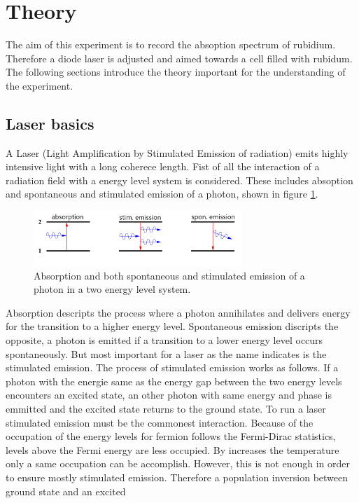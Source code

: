 \section{Theory}
\label{sec:theory}
The aim of this experiment is to record the absoption spectrum
of rubidium. Therefore a diode laser is adjusted and aimed towards a cell
filled with rubidum.
The following sections introduce the theory
important for the understanding of the experiment.

\subsection{Laser basics}
\label{subsec:Laser}
A Laser (Light Amplification by Stimulated Emission of radiation)
emits highly intensive light with a long coherece length.
Fist of all the interaction of a radiation field with
a energy level system is considered. These includes
absoption and spontaneous and stimulated emission
of a photon, shown in figure \ref{fig:ab_em}.
\begin{figure}
\centering
\includegraphics[width=0.7\textwidth]{ab_und_emiss.png}
\caption{Absorption and both spontaneous and stimulated emission of a photon in a two energy level system.
\cite{V61}}
\label{fig:ab_em}
\end{figure}
Absorption descripts the process where a photon annihilates and
delivers energy for the transition
to a higher energy level.
Spontaneous emission discripts the opposite, a photon is
emitted if a transition to a lower energy
level occurs spontaneously.
But most important for a laser as the name indicates
is the stimulated emission.
The process of stimulated emission works as follows.
If a photon with the energie same as
the energy gap between the two energy levels
encounters an excited state, an other photon with
same energy and phase is emmitted and the excited state
returns to the ground state.
To run a laser stimulated emission must be the commonest interaction.
Because of the occupation of the energy levels for fermion follows
the Fermi-Dirac statistics, levels above the Fermi energy are
less occupied. By increases the temperature only
a same occupation can be accomplish.
However, this is not enough in order to ensure mostly stimulated emission.
Therefore a
population inversion between ground state and an excited
